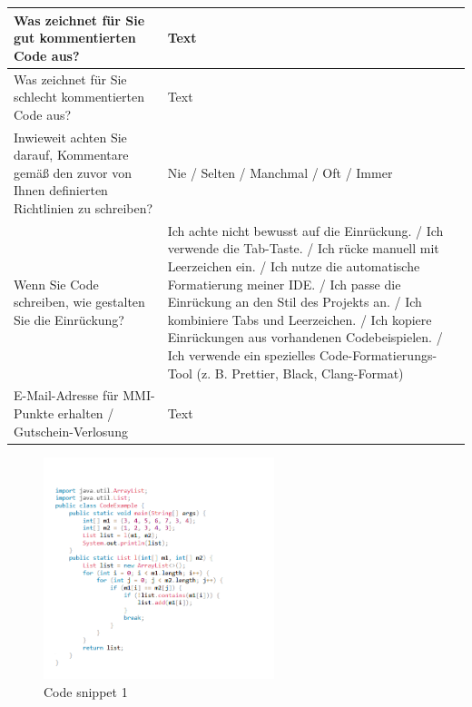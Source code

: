 \begin{table}[H]
{\begin{minipage}{\textwidth}
\begin{longtable}{|p{5cm}|p{9cm}|}
Was zeichnet für Sie gut kommentierten Code aus? & Text \\
\hline
Was zeichnet für Sie schlecht kommentierten Code aus? & Text \\
\hline
Inwieweit achten Sie darauf, Kommentare gemäß den zuvor von Ihnen definierten Richtlinien zu schreiben? & Nie / Selten / Manchmal / Oft / Immer \\
\hline
Wenn Sie Code schreiben, wie gestalten Sie die Einrückung? & Ich achte nicht bewusst auf die Einrückung. / Ich verwende die Tab-Taste. / Ich rücke manuell mit Leerzeichen ein. / Ich nutze die automatische Formatierung meiner IDE. / Ich passe die Einrückung an den Stil des Projekts an. / Ich kombiniere Tabs und Leerzeichen. / Ich kopiere Einrückungen aus vorhandenen Codebeispielen. / Ich verwende ein spezielles Code-Formatierungs-Tool (z. B. Prettier, Black, Clang-Format) \\
\hline
E-Mail-Adresse für MMI-Punkte erhalten / Gutschein-Verlosung & Text \\
\hline
\end{longtable}
\end{minipage}%
} 
\end{table}

\begin{figure}[H]
    \centering
    \includegraphics[width=0.6\textwidth]{figures/schnitt.png}
    \caption{Code snippet 1}
    \label{fig:appendix-example1}
\end{figure}

